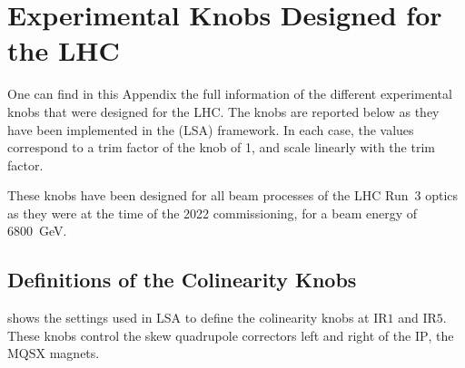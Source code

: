 \chapter{Experimental Knobs Designed for the LHC}
\label{appendix:experimental_knobs}

One can find in this Appendix the full information of the different experimental knobs that were designed for the LHC.
The knobs are reported below as they have been implemented in the  (LSA) framework.
In each case, the values correspond to a trim factor of the knob of \num{1}, and scale linearly with the trim factor.

These knobs have been designed for all beam processes of the LHC Run~\num{3} optics as they were at the time of the \num{2022} commissioning, for a beam energy of \qty{6800}{\giga\electronvolt}.


\section{Definitions of the Colinearity Knobs}

 shows the settings used in LSA to define the colinearity knobs at \(\mathrm{IR1}\) and \(\mathrm{IR5}\).
These knobs control the skew quadrupole correctors left and right of the \(\mathrm{IP}\), the \(\mathrm{MQSX}\) magnets.



